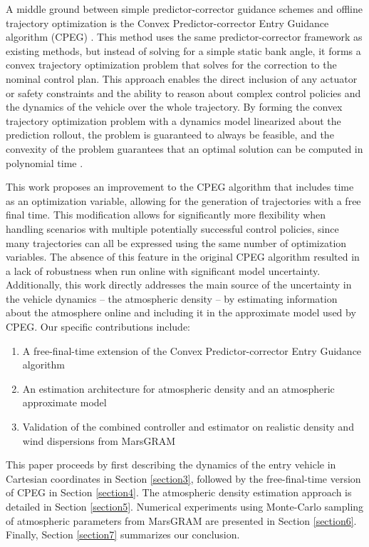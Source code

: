 A middle ground between simple predictor-corrector guidance schemes and offline trajectory optimization is the Convex Predictor-corrector Entry Guidance algorithm (CPEG) \cite{tracy2022a}. This method uses the same predictor-corrector framework as existing methods, but instead of solving for a simple static bank angle, it forms a convex trajectory optimization problem that solves for the correction to the nominal control plan. This approach enables the direct inclusion of any actuator or safety constraints and the ability to reason about complex control policies and the dynamics of the vehicle over the whole trajectory. By forming the convex trajectory optimization problem with a dynamics model linearized about the prediction rollout, the problem is guaranteed to always be feasible, and the convexity of the problem guarantees that an optimal solution can be computed in polynomial time \cite{boyd2004}. 

This work proposes an improvement to the CPEG algorithm that includes time as an optimization variable, allowing for the generation of trajectories with a free final time. This modification allows for significantly more flexibility when handling scenarios with multiple potentially successful control policies, since many trajectories can all be expressed using the same number of optimization variables. The absence of this feature in the original CPEG algorithm resulted in a lack of robustness when run online with significant model uncertainty. Additionally, this work directly addresses the main source of the uncertainty in the vehicle dynamics -- the atmospheric density -- by estimating information about the atmosphere online and including it in the approximate model used by CPEG. Our specific contributions include:
\begin{enumerate}
    \item A free-final-time extension of the Convex Predictor-corrector Entry Guidance algorithm
    \item An estimation architecture for atmospheric density and an atmospheric approximate model
    \item Validation of the combined controller and estimator on realistic density and wind dispersions from MarsGRAM \cite{justh2013}
\end{enumerate}

This paper proceeds by first describing the dynamics of the entry vehicle in Cartesian coordinates in Section \ref{section3}, followed by the free-final-time version of CPEG in Section \ref{section4}. The atmospheric density estimation approach is detailed in Section \ref{section5}. Numerical experiments using Monte-Carlo sampling of atmospheric parameters from MarsGRAM are presented in Section \ref{section6}. Finally, Section \ref{section7} summarizes our conclusion.

